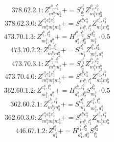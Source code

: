 \documentclass[letterpaper,10pt,fleqn,leqno,onecolumn]{article}
\begin{document}
\begin{equation} \;\;\;\;\;\;  378.62.2.1: Z^{e_{1}^{b},l_{1}^{b}}_{m_{1}^{b}m_{2}^{b}}+=S^{e_{1}^{b}}_{l_{2}^{b}}Z^{l_{1}^{b},l_{2}^{b}}_{m_{1}^{b}m_{2}^{b}} \end{equation}
\begin{equation} \;\;\;\;\;\;  378.62.3.0: Z^{e_{1}^{b}e_{2}^{b}e_{3}^{b}}_{m_{1}^{b}m_{2}^{b}m_{3}^{b}}+=S^{e_{1}^{b}e_{2}^{b}}_{m_{1}^{b},l_{1}^{b}}Z^{e_{3}^{b},l_{1}^{b}}_{m_{2}^{b}m_{3}^{b}} \end{equation}
\begin{equation} \;\;\;\;\;\;  473.70.1.3: Z^{l_{1}^{b},l_{2}^{b}}_{m_{1}^{b},d_{1}^{b}}+=H^{l_{1}^{b},l_{2}^{b}}_{d_{1}^{b},d_{2}^{b}}S^{d_{2}^{b}}_{m_{1}^{b}}\cdot 0.5 \end{equation}
\begin{equation} \;\;\;\;\;\;  473.70.2.2: Z^{l_{1}^{b},l_{2}^{b}}_{m_{1}^{b}m_{2}^{b}}+=S^{d_{1}^{b}}_{m_{1}^{b}}Z^{l_{1}^{b},l_{2}^{b}}_{m_{2}^{b},d_{1}^{b}} \end{equation}
\begin{equation} \;\;\;\;\;\;  473.70.3.1: Z^{e_{1}^{b},l_{1}^{b}}_{m_{1}^{b}m_{2}^{b}}+=S^{e_{1}^{b}}_{l_{2}^{b}}Z^{l_{1}^{b},l_{2}^{b}}_{m_{1}^{b}m_{2}^{b}} \end{equation}
\begin{equation} \;\;\;\;\;\;  473.70.4.0: Z^{e_{1}^{b}e_{2}^{b}e_{3}^{b}}_{m_{1}^{b}m_{2}^{b}m_{3}^{b}}+=S^{e_{1}^{b}e_{2}^{b}}_{m_{1}^{b},l_{1}^{b}}Z^{e_{3}^{b},l_{1}^{b}}_{m_{2}^{b}m_{3}^{b}} \end{equation}
\begin{equation} \;\;\;\;\;\;  362.60.1.2: Z^{e_{1}^{b},l_{1}^{b}}_{m_{1}^{b},d_{1}^{b}}+=H^{e_{1}^{b},l_{1}^{b}}_{d_{1}^{b},d_{2}^{b}}S^{d_{2}^{b}}_{m_{1}^{b}}\cdot 0.5 \end{equation}
\begin{equation} \;\;\;\;\;\;  362.60.2.1: Z^{e_{1}^{b},l_{1}^{b}}_{m_{1}^{b}m_{2}^{b}}+=S^{d_{1}^{b}}_{m_{1}^{b}}Z^{e_{1}^{b},l_{1}^{b}}_{m_{2}^{b},d_{1}^{b}} \end{equation}
\begin{equation} \;\;\;\;\;\;  362.60.3.0: Z^{e_{1}^{b}e_{2}^{b}e_{3}^{b}}_{m_{1}^{b}m_{2}^{b}m_{3}^{b}}+=S^{e_{1}^{b}e_{2}^{b}}_{m_{1}^{b},l_{1}^{b}}Z^{e_{3}^{b},l_{1}^{b}}_{m_{2}^{b}m_{3}^{b}} \end{equation}
\begin{equation} \;\;\;\;\;\;  446.67.1.2: Z^{l_{1}^{b}}_{d_{1}^{b}}+=H^{l_{1}^{b},l_{2}^{b}}_{d_{1}^{b},d_{2}^{b}}S^{d_{2}^{b}}_{l_{2}^{b}} \end{equation}
\end{document}
